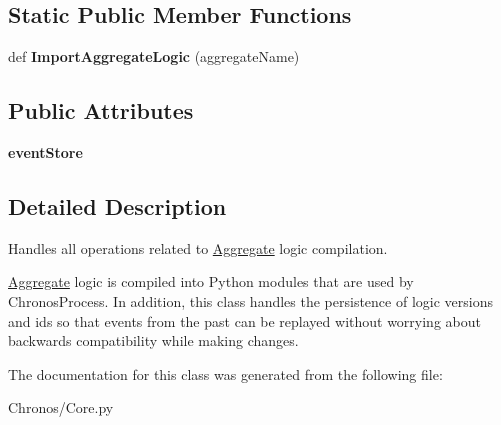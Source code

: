 \subsection*{Static Public Member Functions}
\begin{DoxyCompactItemize}
\item 
def {\bfseries Import\+Aggregate\+Logic} (aggregate\+Name)
\end{DoxyCompactItemize}
\subsection*{Public Attributes}
\begin{DoxyCompactItemize}
\item 
{\bfseries event\+Store}
\end{DoxyCompactItemize}


\subsection{Detailed Description}
Handles all operations related to \hyperlink{classChronos_1_1Core_1_1Aggregate}{Aggregate} logic compilation. 

\hyperlink{classChronos_1_1Core_1_1Aggregate}{Aggregate} logic is compiled into Python modules that are used by Chronos\+Process. In addition, this class handles the persistence of logic versions and ids so that events from the past can be replayed without worrying about backwards compatibility while making changes. 

The documentation for this class was generated from the following file\+:\begin{DoxyCompactItemize}
\item 
Chronos/Core.\+py\end{DoxyCompactItemize}
